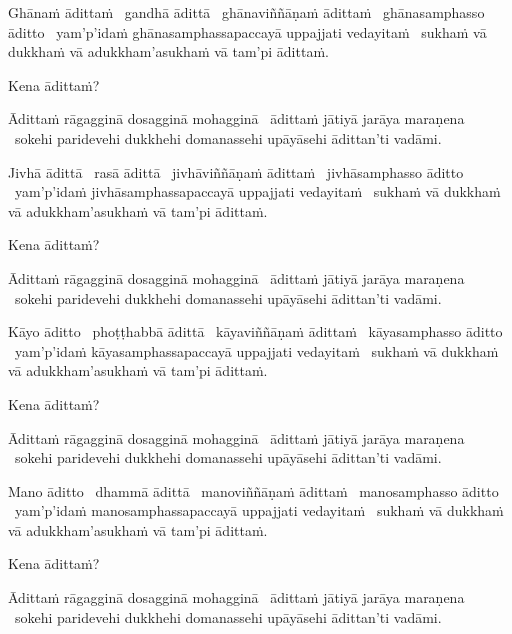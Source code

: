 \begin{pali-hang}
  Ghānaṁ ādittaṁ \breathmark\ gandhā ādittā \breathmark\ ghānaviññāṇaṁ ādittaṁ \breathmark\ ghānasamphasso āditto \breathmark\ yam'p'idaṁ ghānasamphassapaccayā uppajjati vedayitaṁ \breathmark\ sukhaṁ vā dukkhaṁ vā adukkham'asukhaṁ vā tam'pi ādittaṁ.
\end{pali-hang}
\begin{pali-hangtogether}
Kena ādittaṁ?
\end{pali-hangtogether}
\begin{pali-hangtogether}
  Ādittaṁ rāgagginā dosagginā mohagginā \breathmark\ ādittaṁ jātiyā jarāya maraṇena \breathmark\ sokehi paridevehi dukkhehi domanassehi upāyāsehi ādittan'ti vadāmi.
\end{pali-hangtogether}

\begin{pali-hang}
  Jivhā ādittā \breathmark\ rasā ādittā \breathmark\ jivhāviññāṇaṁ ādittaṁ \breathmark\ jivhāsamphasso āditto \breathmark\ yam'p'idaṁ jivhāsamphassapaccayā uppajjati vedayitaṁ \breathmark\ sukhaṁ vā dukkhaṁ vā adukkham'asukhaṁ vā tam'pi ādittaṁ.
\end{pali-hang}
\begin{pali-hangtogether}
Kena ādittaṁ?
\end{pali-hangtogether}
\begin{pali-hangtogether}
  Ādittaṁ rāgagginā dosagginā mohagginā \breathmark\ ādittaṁ jātiyā jarāya maraṇena \breathmark\ sokehi paridevehi dukkhehi domanassehi upāyāsehi ādittan'ti vadāmi.
\end{pali-hangtogether}

\begin{pali-hang}
  Kāyo āditto \breathmark\ phoṭṭhabbā ādittā \breathmark\ kāyaviññāṇaṁ ādittaṁ \breathmark\ kāyasamphasso āditto \breathmark\ yam'p'idaṁ kāyasamphassapaccayā uppajjati vedayitaṁ \breathmark\ sukhaṁ vā dukkhaṁ vā adukkham'asukhaṁ vā tam'pi ādittaṁ.
\end{pali-hang}
\begin{pali-hangtogether}
Kena ādittaṁ?
\end{pali-hangtogether}
\begin{pali-hangtogether}
  Ādittaṁ rāgagginā dosagginā mohagginā \breathmark\ ādittaṁ jātiyā jarāya maraṇena \breathmark\ sokehi paridevehi dukkhehi domanassehi upāyāsehi ādittan'ti vadāmi.
\end{pali-hangtogether}

\begin{pali-hang}
  Mano āditto \breathmark\ dhammā ādittā \breathmark\ manoviññāṇaṁ ādittaṁ \breathmark\ manosamphasso āditto \breathmark\ yam'p'idaṁ manosamphassapaccayā uppajjati vedayitaṁ \breathmark\ sukhaṁ vā dukkhaṁ vā adukkham'asukhaṁ vā tam'pi ādittaṁ.
\end{pali-hang}
\begin{pali-hangtogether}
Kena ādittaṁ?
\end{pali-hangtogether}
\begin{pali-hangtogether}
  Ādittaṁ rāgagginā dosagginā mohagginā \breathmark\ ādittaṁ jātiyā jarāya maraṇena \breathmark\ sokehi paridevehi dukkhehi domanassehi upāyāsehi ādittan'ti vadāmi.
\end{pali-hangtogether}

